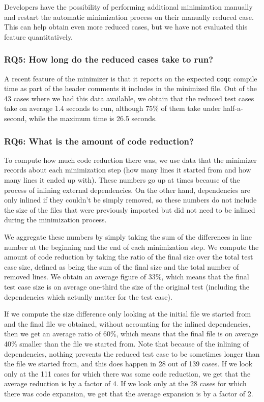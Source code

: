 \documentclass[a4paper,USenglish,cleveref,autoref,thm-restate]{lipics-v2021}
\begin{document}
Developers have the possibility of performing additional minimization manually and restart the automatic minimization process on their manually reduced case. This can help obtain even more reduced cases, but we have not evaluated this feature quantitatively.

\subsubsection{RQ5: How long do the reduced cases take to run?}

A recent feature of the minimizer is that it reports on the expected \texttt{coqc} compile time as part of the header comments it includes in the minimized file. Out of the 43 cases where we had this data available, we obtain that the reduced test cases take on average 1.4 seconds to run, although 75\% of them take under half-a-second, while the maximum time is 26.5 seconds.

\subsubsection{RQ6: What is the amount of code reduction?}

To compute how much code reduction there was, we use data that the minimizer records about each minimization step (how many lines it started from and how many lines it ended up with). These numbers go up at times because of the process of inlining external dependencies. On the other hand, dependencies are only inlined if they couldn't be simply removed, so these numbers do not include the size of the files that were previously imported but did not need to be inlined during the minimization process.

We aggregate these numbers by simply taking the sum of the differences in line number at the beginning and the end of each minimization step. We compute the amount of code reduction by taking the ratio of the final size over the total test case size, defined as being the sum of the final size and the total number of removed lines. We obtain an average figure of 33\%, which means that the final test case size is on average one-third the size of the original test (including the dependencies which actually matter for the test case).

If we compute the size difference only looking at the initial file we started from and the final file we obtained, without accounting for the inlined dependencies, then we get an average ratio of 60\%, which means that the final file is on average 40\% smaller than the file we started from. Note that because of the inlining of dependencies, nothing prevents the reduced test case to be sometimes longer than the file we started from, and this does happen in 28 out of 139 cases. If we look only at the 111 cases for which there was some code reduction, we get that the average reduction is by a factor of 4. If we look only at the 28 cases for which there was code expansion, we get that the average expansion is by a factor of 2.
\end{document}
